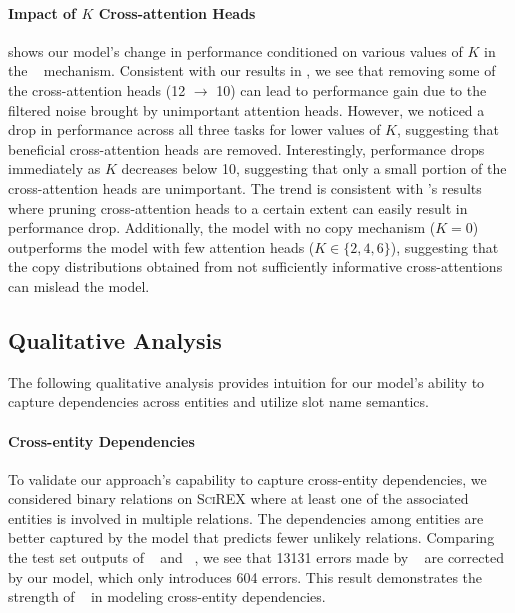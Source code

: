 \documentclass[11pt]{article}
\begin{document}
\paragraph{Impact of $K$ Cross-attention Heads}
 shows our model's change in performance conditioned on various values of $K$ in the \topkcopy~ mechanism. Consistent with our results in , we see that removing some of the cross-attention heads (12 $\rightarrow$ 10) can lead to performance gain due to the filtered noise brought by unimportant attention heads. However, we noticed a drop in performance across all three tasks for lower values of $K$, suggesting that beneficial cross-attention heads are removed. Interestingly, performance drops immediately as $K$ decreases below 10, suggesting that only a small portion of the cross-attention heads are unimportant. The trend is consistent with \citet{NEURIPS2019_2c601ad9}'s results where
pruning cross-attention heads to a certain extent can easily result in performance drop. Additionally, the model with no copy mechanism ($K=0$) outperforms the model with few attention heads ($K \in \{2,4,6\}$), suggesting that the copy distributions obtained from not sufficiently informative cross-attentions can mislead the model.


\subsection{Qualitative Analysis}
The following qualitative analysis provides intuition for our model's ability to capture dependencies across entities and utilize slot name semantics. 

\paragraph{Cross-entity Dependencies} To validate our approach's capability to capture cross-entity dependencies, we considered binary relations on \textsc{SciREX} where at least one of the associated entities is involved in multiple relations. The dependencies among entities are better captured by the model that predicts fewer unlikely relations. Comparing the test set outputs of \modelshort~ and \scirexpipeline~, we see that 13131 errors made by \scirexpipeline~ are corrected by our model, which only introduces 604 errors. This result demonstrates the strength of \modelshort~ in modeling cross-entity dependencies.
\end{document}

